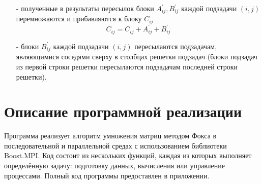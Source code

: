 \documentclass{report}
\begin{document}
\begin{enumerate}
\begin{itemize}
\begin{itemize}
                \item[-] полученные в результаты пересылок блоки {\itshape $A_{ij}^{'}, B_{ij}^{'}$} каждой подзадачи {\itshape $(i,j)$} перемножаются и прибавляются к блоку {\itshape $C_{ij}$}
                $$
                {\mathit C_{ij} = C_{ij} + A_{ij}^{'} + B_{ij}^{'}}
                $$
                \item[-] блоки {\itshape $B_{ij}^{'}$} каждой подзадачи {\itshape $(i,j)$} пересылаются подзадачам, являющимися соседями сверху в столбцах решетки подзадач (блоки подзадач из первой строки решетки пересылаются подзадачам последней строки решетки).
            \end{itemize}
        \end{itemize}
\end{enumerate}

\newpage

\section*{Описание программной реализации}
 Программа реализует алгоритм умножения матриц методом Фокса в последовательной и параллельной средах с использованием библиотеки Boost.MPI. Код состоит из нескольких функций, каждая из которых выполняет определённую задачу: подготовку данных, вычисления или управление процессами. Полный код программы предоставлен в приложении.
\end{document}
